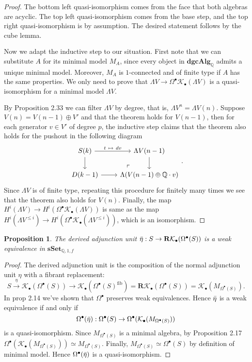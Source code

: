 \documentclass[psamsfonts]{amsart}
\newtheorem{prop}{Proposition}[section]
\theoremstyle{definition}
\newcommand{\Q}{\mathbb{Q}}
\newcommand{\sSet}{\mathbf{sSet}}
\newcommand{\dgcAlg}{\mathbf{dgcAlg}}
\numberwithin{equation}{section}
\begin{document}
\begin{proof}
The bottom left quasi-isomorphism comes from the face that both algebras are acyclic. The top left quasi-isomorphism comes from the base step, and the top right quasi-isomorphism is by assumption. The desired statement follows by the cube lemma.\medbreak

Now we adapt the inductive step to our situation. First note that we can substitute $A$ for its minimal model $M_A$, since every object in $\dgcAlg_\Q$ admits a unique minimal model. Moreover, $M_A$ is $1$-connected and of finite type if $A$ has the same properties. We only need to prove that $\Lambda V\to\Omega^\bullet\mathcal{K}_\bullet(\Lambda V)$ is a quasi-isomorphism for a minimal model $\Lambda V$.\medbreak

By Proposition 2.33 we can filter $\Lambda V$ by degree, that is, $\Lambda V^n=\Lambda V(n)$. Suppose $V(n)=V(n-1)\oplus V'$ and that the theorem holds for $V(n-1)$, then for each generator $v\in V'$ of degree $p$, the inductive step claims that the theorem also holds for the pushout in the following diagram
\[\begin{tikzcd}
S(k)\arrow[d]\arrow{r}{t\ \mapsto\ dv}&\Lambda V(n-1)\arrow[d]\\
D(k-1)\arrow[r]&\Lambda(V(n-1)\oplus\Q\cdot v) \arrow[ul, phantom, "\ulcorner",very near start]
\end{tikzcd}.\]
Since $\Lambda V$ is of finite type, repeating this procedure for finitely many times we see that the theorem also holds for $V(n)$. Finally, the map $H^i(\Lambda V)\to H^i(\Omega^\bullet\mathcal{K}_\bullet(\Lambda V))$ is same as the map $H^i(\Lambda V^{\leq i})\to H^i(\Omega^\bullet\mathcal{K}_\bullet(\Lambda V^{\leq i}))$, which is an isomorphism.
\end{proof}

\begin{prop}
The derived adjunction unit $\Bar{\eta}:S\to\mathbf{R}\mathcal{K}_\bullet(\Omega^\bullet(S))$ is a weak equivalence in $\sSet_{\Q,1,f}$
\end{prop}
\begin{proof}
The derived adjunction unit is the composition of the normal adjunction unit $\eta$ with a fibrant replacement:
\[S\xrightarrow{\ \eta\ }\mathcal{K}_\bullet(\Omega^\bullet(S))\longrightarrow\mathcal{K}_\bullet(\Omega^\bullet(S)^\textrm{fib})=\mathbf{R}\mathcal{K}_\bullet(\Omega^\bullet(S))=\mathcal{K}_\bullet(M_{\Omega^\bullet(S)}).\]
In prop 2.14 we've shown that $\Omega^\bullet$ preserves weak equivalences. Hence $\Bar{\eta}$ is a weak equivalence if and only if
\[\Omega^\bullet(\Bar{\eta}):\Omega^\bullet(S)\to\Omega^\bullet(\mathcal{K}_\bullet(M_{\Omega^\bullet(S)}))\]
is a quasi-isomorphism. Since $M_{\Omega^\bullet(S)}$ is a minimal algebra, by Proposition 2.17 $\Omega^\bullet(\mathcal{K}_\bullet(M_{\Omega^\bullet(S)}))\simeq M_{\Omega^\bullet(S)}$. Finally, $M_{\Omega^\bullet(S)}\simeq\Omega^\bullet(S)$ by definition of minimal model. Hence $\Omega^\bullet(\Bar{\eta})$ is a quasi-isomorphism.
\end{proof}
\end{document}
